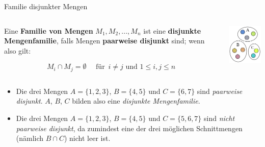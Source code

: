 \documentclass[12pt,ngerman,a4paper,ignorenonframetext,]{beamer}
\providecommand{\tightlist}{%
  \setlength{\itemsep}{0pt}\setlength{\parskip}{0pt}}
\begin{document}
\begin{frame}{Familie disjunkter Mengen}
\protect\hypertarget{familie-disjunkter-mengen}{}

\begin{columns}[T]
\begin{column}{0.66\textwidth}

\begin{definition}

Eine \textbf{Familie von Mengen} \(\displaystyle M_1,M_2, ... , M_n\)
ist eine \textbf{disjunkte Mengenfamilie}, falls Mengen
\textbf{paarweise disjunkt} sind; wenn also gilt:

\[ M_i \cap M_j = \emptyset \quad \text{ für } \!\,i \ne j \text{ und } 1 \leq i,j \leq n \]

\end{definition}
\end{column}

\begin{column}{0.33\textwidth}
\begin{center}\includegraphics[width=0.6\linewidth]{./images/MGWI/126px-Disjuct-sets} \end{center}
\end{column}
\end{columns}


\begin{Beispiele}[]

\begin{itemize}
\tightlist
\item
  Die drei Mengen \(A = \{1, 2, 3\}\), \(B = \{4, 5\}\) und
  \(C = \{6, 7\}\) sind \emph{paarweise disjunkt}. \(A\), \(B\), \(C\)
  bilden also eine \emph{disjunkte Mengenfamilie}.
\item
  Die drei Mengen \(A = \{1, 2, 3\}\), \(B = \{4, 5\}\) und
  \(C = \{5, 6, 7\}\) sind \emph{nicht paarweise disjunkt}, da zumindest
  eine der drei möglichen Schnittmengen (nämlich \(B \cap C\)) nicht
  leer ist.
\end{itemize}

\end{Beispiele}

\end{frame}
\end{document}
